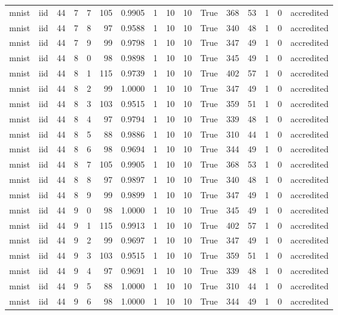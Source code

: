 \begin{tabular}{llrrrrrrrrrrrrrl}
mnist & iid & 44 & 7 & 7 & 105 & 0.9905 & 1 & 10 & 10 & True & 368 & 53 & 1 & 0 & accredited \\
mnist & iid & 44 & 7 & 8 & 97 & 0.9588 & 1 & 10 & 10 & True & 340 & 48 & 1 & 0 & accredited \\
mnist & iid & 44 & 7 & 9 & 99 & 0.9798 & 1 & 10 & 10 & True & 347 & 49 & 1 & 0 & accredited \\
mnist & iid & 44 & 8 & 0 & 98 & 0.9898 & 1 & 10 & 10 & True & 345 & 49 & 1 & 0 & accredited \\
mnist & iid & 44 & 8 & 1 & 115 & 0.9739 & 1 & 10 & 10 & True & 402 & 57 & 1 & 0 & accredited \\
mnist & iid & 44 & 8 & 2 & 99 & 1.0000 & 1 & 10 & 10 & True & 347 & 49 & 1 & 0 & accredited \\
mnist & iid & 44 & 8 & 3 & 103 & 0.9515 & 1 & 10 & 10 & True & 359 & 51 & 1 & 0 & accredited \\
mnist & iid & 44 & 8 & 4 & 97 & 0.9794 & 1 & 10 & 10 & True & 339 & 48 & 1 & 0 & accredited \\
mnist & iid & 44 & 8 & 5 & 88 & 0.9886 & 1 & 10 & 10 & True & 310 & 44 & 1 & 0 & accredited \\
mnist & iid & 44 & 8 & 6 & 98 & 0.9694 & 1 & 10 & 10 & True & 344 & 49 & 1 & 0 & accredited \\
mnist & iid & 44 & 8 & 7 & 105 & 0.9905 & 1 & 10 & 10 & True & 368 & 53 & 1 & 0 & accredited \\
mnist & iid & 44 & 8 & 8 & 97 & 0.9897 & 1 & 10 & 10 & True & 340 & 48 & 1 & 0 & accredited \\
mnist & iid & 44 & 8 & 9 & 99 & 0.9899 & 1 & 10 & 10 & True & 347 & 49 & 1 & 0 & accredited \\
mnist & iid & 44 & 9 & 0 & 98 & 1.0000 & 1 & 10 & 10 & True & 345 & 49 & 1 & 0 & accredited \\
mnist & iid & 44 & 9 & 1 & 115 & 0.9913 & 1 & 10 & 10 & True & 402 & 57 & 1 & 0 & accredited \\
mnist & iid & 44 & 9 & 2 & 99 & 0.9697 & 1 & 10 & 10 & True & 347 & 49 & 1 & 0 & accredited \\
mnist & iid & 44 & 9 & 3 & 103 & 0.9515 & 1 & 10 & 10 & True & 359 & 51 & 1 & 0 & accredited \\
mnist & iid & 44 & 9 & 4 & 97 & 0.9691 & 1 & 10 & 10 & True & 339 & 48 & 1 & 0 & accredited \\
mnist & iid & 44 & 9 & 5 & 88 & 1.0000 & 1 & 10 & 10 & True & 310 & 44 & 1 & 0 & accredited \\
mnist & iid & 44 & 9 & 6 & 98 & 1.0000 & 1 & 10 & 10 & True & 344 & 49 & 1 & 0 & accredited \\

\end{tabular}
